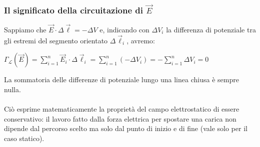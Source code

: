 \documentclass[]{beamer}
\theoremstyle{plain}
\begin{document}
\begin{frame}
  \frametitle{Il significato della circuitazione di $ \vec{E} $}
  Sappiamo che $ \vec{E}\cdot \Delta\vec{\ell} = - \Delta V $ e, indicando con $ \Delta V_i $  la differenza di potenziale tra gli estremi del segmento orientato $ \Delta \vec{\ell}_i $, avremo:
  \begin{center}
  $ \Gamma_\mathscr{L} (\vec{E}) = \sum\limits_{i=1}^n \vec{E}_i \cdot \Delta \vec{\ell}_i = \sum\limits_{i=1}^n (-\Delta V_i) = - \sum\limits_{i=1}^n \Delta V_i = 0 $
  \end{center}\pause
  La sommatoria delle differenze di potenziale lungo una linea chiusa è sempre nulla.\\\pause~\\
  
Ciò esprime matematicamente la proprietà del campo elettrostatico di essere \alert{conservativo}: il lavoro fatto dalla forza elettrica per spostare una carica non dipende dal percorso scelto ma solo dal punto di inizio e di fine (vale solo per il caso statico).
\end{frame}
\end{document}
